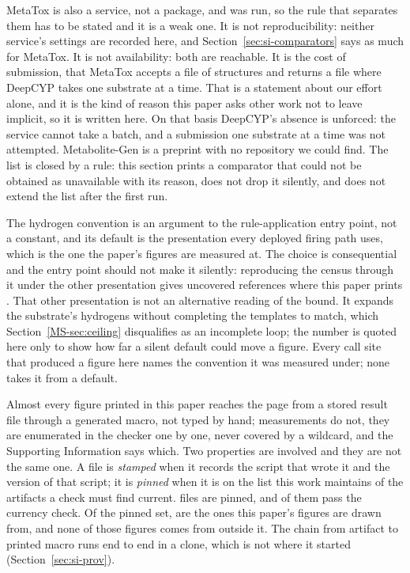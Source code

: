 \documentclass[journal=jcisd8,manuscript=suppinfo,layout=onecolumn]{achemso}
\begin{document}
MetaTox is also a service, not a package, and was run, so the rule that separates them has
to be stated and it is a weak one. It is not reproducibility: neither service's settings are
recorded here, and Section~\ref{sec:si-comparators} says as much for MetaTox. It is not
availability: both are reachable. It is the cost of submission, that MetaTox accepts a file of
\numPopulationN{} structures and returns a file where DeepCYP takes one substrate at a time.
That is a statement about our effort alone, and it is the kind of reason this paper asks other work
not to leave implicit, so it is written here.
On that basis DeepCYP's absence is unforced: the service cannot take a batch, and a submission
one substrate at a time was not attempted. Metabolite-Gen \citep{Chavan_2026} is a preprint with no
repository we could
find. The list is closed by a rule: this section prints a comparator that could not be obtained as
unavailable with its reason, does not drop it silently, and does not extend the list after the
first run.

The hydrogen convention is an argument to the rule-application entry point, not a
constant, and its default is the presentation every deployed firing path uses, which is the one the
paper's figures are measured at. The choice is consequential and the entry point should not make it
silently: reproducing the census through it under the other presentation gives
\numHydUncoveredexpanded{} uncovered references where this paper prints \numCeilingUncovered{}. That
other
presentation is not an alternative reading of the bound. It expands the substrate's hydrogens
without completing the templates to match, which Section~\ref{MS-sec:ceiling} disqualifies as an
incomplete loop; the number is quoted here only to show how far a silent
default could move a figure. Every call site
that produced a figure here names the convention it was measured under; none takes it from
a default.

Almost every figure printed in this paper reaches the page from a stored result file through a
generated macro, not typed by hand; \numProvHandtyped{} measurements do not, they are enumerated
in the checker one by one, never covered by a wildcard, and the Supporting Information says which.
Two properties are involved and they are not the same one. A file is \emph{stamped} when it
records the script that wrote it and the version of that script; it is \emph{pinned} when it is on
the list this work maintains of the artifacts a check must find current. \numProvPinned{} files are
pinned, and \numProvPinnedcurrent{} of them pass the currency check. Of the pinned set,
\numProvSources{} are the ones this paper's figures are drawn from, and none of those figures comes
from outside it.
 The chain from artifact to printed
macro runs end to end in a clone, which is not where it started
(Section~\ref{sec:si-prov}).
\end{document}
